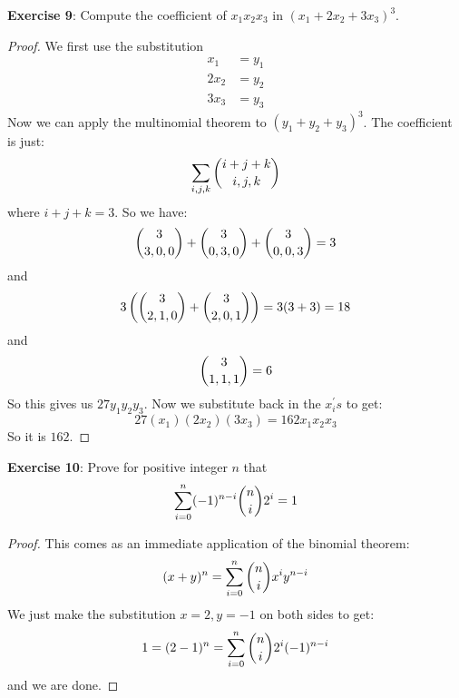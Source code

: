 \documentclass{article}
\begin{document}
\textbf{Exercise 9}: Compute the coefficient of $x_{1}x_{2}x_{3}$ in $(x_{1} + 2x_{2} + 3x_{3})^{3}$.
    \begin{proof}
        We first use the substitution
            \begin{align*}
                x_{1}  &= y_{1} \\
                2x_{2} &= y_{2} \\
                3x_{3} &= y_{3}   
            \end{align*}
        Now we can apply the multinomial theorem to $(y_{1} + y_{2} + y_{3})^{3}$. The coefficient is just:
            \begin{equation*}
                \sum_{i, j, k} \dbinom{i + j + k}{i, j, k}
            \end{equation*}
        where $i+ j + k = 3$. So we have:
            \begin{equation*}
                \dbinom{3}{3, 0, 0} + \dbinom{3}{0, 3, 0} + \dbinom{3}{0, 0, 3} = 3
            \end{equation*}
        and
            \begin{equation*}
                3\left(\dbinom{3}{2, 1, 0} + \dbinom{3}{2, 0, 1}\right) = 3(3 + 3) = 18
            \end{equation*}
        and 
            \begin{equation*}
                \dbinom{3}{1, 1, 1} = 6
            \end{equation*}
        So this gives us $27y_{1}y_{2}y_{3}$. Now we substitute back in the $x_{i}^{\prime}s$ to get:
            \begin{equation*}
                27(x_{1})(2x_{2})(3x_{3}) = 162x_{1}x_{2}x_{3}
            \end{equation*}
        So it is $162$.
    \end{proof}

\textbf{Exercise 10}: Prove for positive integer $n$ that
    \begin{equation*}
        \sum_{i = 0}^{n}(-1)^{n - i}\dbinom{n}{i}2^{i} = 1
    \end{equation*}
        \begin{proof}
            This comes as an immediate application of the binomial theorem:
                \begin{equation*}
                    (x + y)^{n} = \sum_{i = 0}^{n}\dbinom{n}{i}x^{i}y^{n -i}
                \end{equation*}
            We just make the substitution $x = 2, y = -1$ on both sides to get:
                \begin{equation*}
                    1 = (2 - 1)^{n} = \sum_{i = 0}^{n}\dbinom{n}{i}2^{i}(-1)^{n - i}
                \end{equation*}
            and we are done.
        \end{proof}
\end{document}
